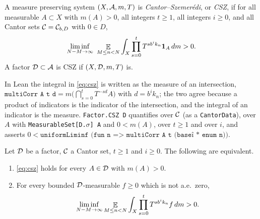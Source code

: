 \label{chap:csz}

\begin{definition}
  \label{def:csz}
  \leanok
  A measure preserving system $(X,\mathcal{A},m,T)$ is \emph{Cantor--Szemer\'edi}, or \emph{CSZ}, if
  for all measurable $A \subset X$ with $m(A) > 0$, all integers $t \geq 1$, all integers
  $i \geq 0$, and all Cantor sets $\mathcal{C} = \mathcal{C}_{b,D}$ with $0 \in D$,
  \begin{equation}
    \label{eq:csz}
    \liminf_{N-M \to \infty} \ \mathop{\mathbb{E}}_{M \leq n < N} \int_X \prod_{s=0}^{t} T^{s b^i k_n} \mathbf{1}_A \, dm > 0 .
  \end{equation}
  A factor $\mathcal{D} \subset \mathcal{A}$ is CSZ if $(X,\mathcal{D},m,T)$ is.
\end{definition}

\begin{remark}
  \leanok
  In Lean the integral in \eqref{eq:csz} is written as the measure of an intersection,
  $\texttt{multiCorr A t d} = m\bigl(\bigcap_{s=0}^{t} T^{-sd}A\bigr)$ with $d = b^ik_n$; the two
  agree because a product of indicators is the indicator of the intersection, and the integral
  of an indicator is the measure.  \texttt{Factor.CSZ D} quantifies over $\mathcal{C}$ (as a
  \texttt{CantorData}), over $A$ with \texttt{MeasurableSet[D.\ensuremath{\sigma}] A} and
  $0 < m(A)$, over $t \geq 1$ and over $i$, and asserts
  $0 < \texttt{uniformLiminf (fun n => multiCorr A t (base\^{}i * enum n))}$.
\end{remark}

\begin{lemma}
  \label{lem:csz-functions}
  \leanok
  Let $\mathcal{D}$ be a factor, $\mathcal{C}$ a Cantor set, $t \geq 1$ and $i \geq 0$.  The following
  are equivalent.
  \begin{enumerate}
    \item[(a)] \eqref{eq:csz} holds for every $A \in \mathcal{D}$ with $m(A) > 0$.
    \item[(b)] For every bounded $\mathcal{D}$-measurable $f \geq 0$ which is not a.e.\ zero,
      \[
        \liminf_{N-M \to \infty} \mathop{\mathbb{E}}_{M \leq n < N} \int_X \prod_{s=0}^{t} T^{sb^ik_n} f\,dm > 0 .
      \]
  \end{enumerate}
\end{lemma}

